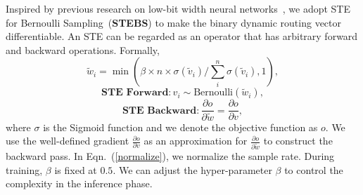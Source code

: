 \documentclass[10pt,twocolumn,letterpaper]{article}
\begin{document}
Inspired by previous research on low-bit width neural networks~\cite{dorefanet, hubara2017quantized}, we adopt STE for Bernoulli Sampling~(\textbf{STEBS}) to make the binary dynamic routing vector differentiable. An STE can be regarded as an operator that has arbitrary forward and backward operations. Formally,
\begin{equation}
\tilde{w}_i = \min(\beta\times n\times\sigma(\tilde{v}_i) / \sum_i^n \sigma(\tilde{v}_i), 1),
\label{normalize}
\end{equation}
\begin{equation}
\textbf{STE Forward}: v_i \sim \text{Bernoulli}(\tilde{w}_i),
\end{equation}
\begin{equation}
\textbf{STE Backward}: \frac{\partial o}{\partial \tilde{w}} = \frac{\partial o}{\partial v},
\end{equation}
where $\sigma$ is the Sigmoid function and we denote the objective function as $o$. We use the well-defined gradient $\frac{\partial o}{\partial v}$ as an approximation for $\frac{\partial o}{\partial \tilde{w}}$ to construct the backward pass. In Eqn.~(\ref{normalize}), we normalize the sample rate. During training, $\beta$ is fixed at $0.5$. We can adjust the hyper-parameter $\beta$ to control the complexity in the inference phase.
\end{document}
